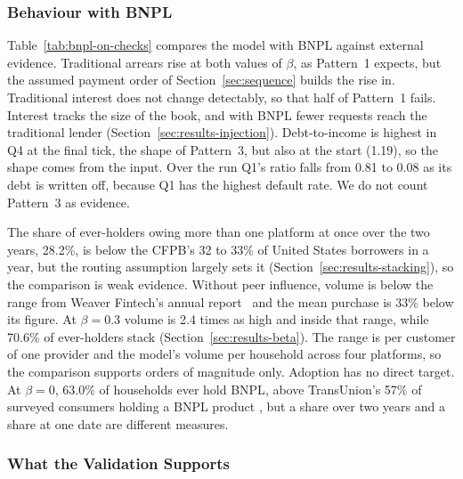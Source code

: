 \subsubsection*{Behaviour with BNPL}

Table~\ref{tab:bnpl-on-checks} compares the model with \ac{BNPL} against external evidence.
Traditional arrears rise at both values of $\beta$, as Pattern~1 expects, but the assumed payment
order of Section~\ref{sec:sequence} builds the rise in. Traditional interest does
not change detectably, so that half of Pattern~1 fails. Interest tracks the size of the book, and
with \ac{BNPL} fewer requests reach the traditional lender (Section~\ref{sec:results-injection}). Debt-to-income is highest in
Q4 at the final tick, the shape of Pattern~3, but also at the start (1.19), so the shape comes
from the input. Over the run Q1's ratio falls from 0.81 to 0.08 as its debt is written off, because Q1 has
the highest default rate. We do not count Pattern~3 as evidence.



The share of ever-holders owing more than one platform at once over the two years, 28.2\%, is
below the \ac{CFPB}'s 32 to 33\% of United States borrowers in a year, but the routing assumption largely sets it
(Section~\ref{sec:results-stacking}), so the comparison is weak evidence. Without peer influence,
volume is below the range from Weaver Fintech's annual report~\citep{weaver2025iar} and the mean
purchase is 33\% below its figure. At $\beta=0.3$ volume is 2.4 times as high and
inside that range, while 70.6\% of ever-holders stack (Section~\ref{sec:results-beta}). The
range is per customer of one provider and the model's volume per household across four
platforms, so the comparison supports orders of magnitude only.
Adoption has no direct target. At $\beta=0$, 63.0\% of households ever hold \ac{BNPL}, above
TransUnion's 57\% of surveyed consumers holding a \ac{BNPL} product
\citep{transunion_cir_sa_2026}, but a share over two years and a share at one date are
different measures.

\subsubsection*{What the Validation Supports}


